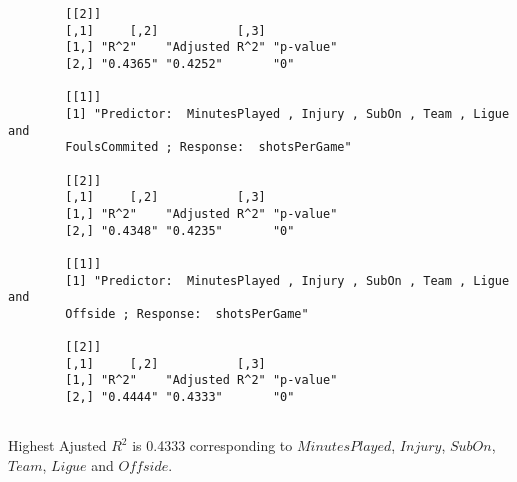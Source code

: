 \documentclass[12pt]{article}
\begin{document}
\begin{verbatim}
		[[2]]
		[,1]     [,2]           [,3]     
		[1,] "R^2"    "Adjusted R^2" "p-value"
		[2,] "0.4365" "0.4252"       "0"      
		
		[[1]]
		[1] "Predictor:  MinutesPlayed , Injury , SubOn , Team , Ligue and 
		FoulsCommited ; Response:  shotsPerGame"
		
		[[2]]
		[,1]     [,2]           [,3]     
		[1,] "R^2"    "Adjusted R^2" "p-value"
		[2,] "0.4348" "0.4235"       "0"      
		
		[[1]]
		[1] "Predictor:  MinutesPlayed , Injury , SubOn , Team , Ligue and 
		Offside ; Response:  shotsPerGame"
		
		[[2]]
		[,1]     [,2]           [,3]     
		[1,] "R^2"    "Adjusted R^2" "p-value"
		[2,] "0.4444" "0.4333"       "0"      
		
	\end{verbatim}
		Highest Ajusted $ R^2 $ is 0.4333 corresponding to $ MinutesPlayed $, $ Injury $, $ SubOn $, $ Team $, $ Ligue $ and $ Offside $.
	
\end{document}
